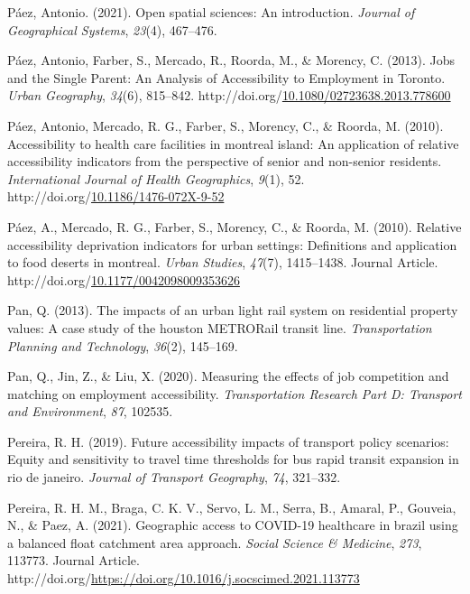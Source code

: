 \documentclass[
11pt, %
oneside, %
english, %
singlespacing, %
]{macthesis} %
\newlength{\cslhangindent}
\newenvironment{CSLReferences}[2] %
{\begin{list}{}{%
	\setlength{\itemindent}{0pt}
	\setlength{\leftmargin}{0pt}
	\setlength{\parsep}{0pt}
	\ifodd #1
	\setlength{\leftmargin}{\cslhangindent}
	\setlength{\itemindent}{-1\cslhangindent}
	\fi
	\setlength{\itemsep}{#2\baselineskip}}}
{\end{list}}
\begin{document}
\begin{CSLReferences}{1}{0}
Páez, Antonio. (2021). Open spatial sciences: An introduction. \emph{Journal of Geographical Systems}, \emph{23}(4), 467--476.

Páez, Antonio, Farber, S., Mercado, R., Roorda, M., \& Morency, C. (2013). Jobs and the {Single} {Parent}: {An} {Analysis} of {Accessibility} to {Employment} in {Toronto}. \emph{Urban Geography}, \emph{34}(6), 815--842. http://doi.org/\href{https://doi.org/10.1080/02723638.2013.778600}{10.1080/02723638.2013.778600}

Páez, Antonio, Mercado, R. G., Farber, S., Morency, C., \& Roorda, M. (2010). Accessibility to health care facilities in montreal island: An application of relative accessibility indicators from the perspective of senior and non-senior residents. \emph{International Journal of Health Geographics}, \emph{9}(1), 52. http://doi.org/\href{https://doi.org/10.1186/1476-072X-9-52}{10.1186/1476-072X-9-52}

Páez, A., Mercado, R. G., Farber, S., Morency, C., \& Roorda, M. (2010). Relative accessibility deprivation indicators for urban settings: Definitions and application to food deserts in montreal. \emph{Urban Studies}, \emph{47}(7), 1415--1438. Journal Article. http://doi.org/\href{https://doi.org/10.1177/0042098009353626}{10.1177/0042098009353626}

Pan, Q. (2013). The impacts of an urban light rail system on residential property values: A case study of the houston METRORail transit line. \emph{Transportation Planning and Technology}, \emph{36}(2), 145--169.

Pan, Q., Jin, Z., \& Liu, X. (2020). Measuring the effects of job competition and matching on employment accessibility. \emph{Transportation Research Part D: Transport and Environment}, \emph{87}, 102535.

Pereira, R. H. (2019). Future accessibility impacts of transport policy scenarios: Equity and sensitivity to travel time thresholds for bus rapid transit expansion in rio de janeiro. \emph{Journal of Transport Geography}, \emph{74}, 321--332.

Pereira, R. H. M., Braga, C. K. V., Servo, L. M., Serra, B., Amaral, P., Gouveia, N., \& Paez, A. (2021). Geographic access to COVID-19 healthcare in brazil using a balanced float catchment area approach. \emph{Social Science \& Medicine}, \emph{273}, 113773. Journal Article. http://doi.org/\url{https://doi.org/10.1016/j.socscimed.2021.113773}


\end{CSLReferences}
\end{document}
